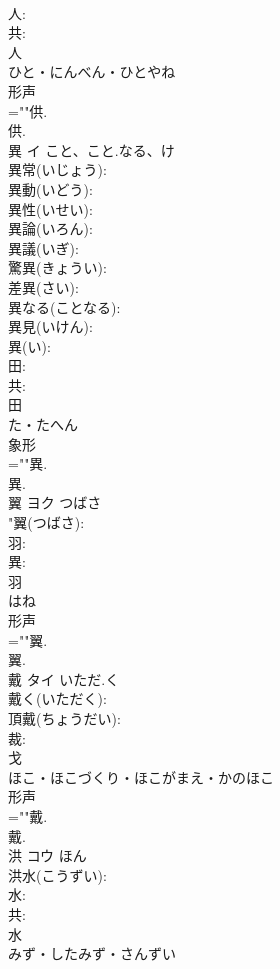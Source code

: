 \documentclass[8pt]{extreport}
\begin{document}
\begin{CJK}{UTF8}{min}
\\	人: 
\\	共: 
\\	人	
\\	ひと・にんべん・ひとやね	
\\	形声 
\\	=""供.
\\	供.
\\	異	イ	こと、こと.なる、け		
\\	異常(いじょう): 
\\	異動(いどう): 
\\	異性(いせい): 
\\	異論(いろん): 
\\	異議(いぎ): 
\\	驚異(きょうい): 
\\	差異(さい): 
\\	異なる(ことなる): 
\\	異見(いけん): 
\\	異(い): 
\\	田: 
\\	共: 
\\	田	
\\	た・たへん	
\\	象形 
\\	=""異.
\\	異.
\\	翼	ヨク	つばさ		
\\	"翼(つばさ): 
\\	羽: 
\\	異: 
\\	羽	
\\	はね	
\\	形声 
\\	=""翼.
\\	翼.
\\	戴	タイ	いただ.く		
\\	戴く(いただく): 
\\	頂戴(ちょうだい): 
\\	裁: 
\\	戈	
\\	ほこ・ほこづくり・ほこがまえ・かのほこ	
\\	形声 
\\	=""戴.
\\	戴.
\\	洪	コウ		ほん	
\\	洪水(こうずい): 
\\	水: 
\\	共: 
\\	水	
\\	みず・したみず・さんずい	

\end{CJK}
\end{document}
